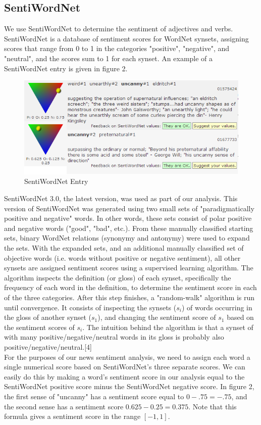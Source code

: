 \documentclass[pageno]{jpaper}
\begin{document}
\subsection{SentiWordNet}
\indent We use SentiWordNet to determine the sentiment of adjectives and verbs. SentiWordNet is a database of sentiment scores for WordNet synsets, assigning scores that range from 0 to 1 in the categories "positive", "negative", and "neutral", and the scores sum to 1 for each synset. An example of a SentiWordNet entry is given in figure 2.\\
\begin{figure}
\centering
\includegraphics[width=140mm]{sentiwordnet.png}
\caption{SentiWordNet Entry}
\label{overflow}
\end{figure}
\indent SentiWordNet 3.0, the latest version, was used as part of our analysis. This version of SentiWordNet was generated using two small sets of "paradigmatically positive and negative" words. In other words, these sets consist of polar positive and negative words ("good", "bad", etc.). From these manually classified starting sets, binary WordNet relations (synonymy and antonymy) were used to expand the sets. With the expanded sets, and an additional manually classified set of objective words (i.e. words without positive or negative sentiment), all other synsets are assigned sentiment scores using a supervised learning algorithm. The algorithm inspects the definition (or gloss) of each synset, specifically the frequency of each word in the definition, to determine the sentiment score in each of the three categories. After this step finishes, a "random-walk" algorithm is run until convergence. It consists of inspecting the synsets ($s_i$) of words occurring in the gloss of another synset ($s_1$), and changing the sentiment score of $s_1$ based on the sentiment scores of $s_i$. The intuition behind the algorithm is that a synset of with many positive/negative/neutral words in its gloss is probably also positive/negative/neutral.[4] \\
\indent For the purposes of our news sentiment analysis, we need to assign each word a single numerical score based on SentiWordNet's three separate scores. We can easily do this by making a word's sentiment score in our analysis equal to the SentiWordNet positive score minus the SentiWordNet negative score. In figure 2, the first sense of "uncanny" has a sentiment score equal to $0 - .75 = -.75$, and the second sense has a sentiment score $0.625-0.25 = 0.375$. Note that this formula gives a sentiment score in the range $[-1, 1]$.
\end{document}
